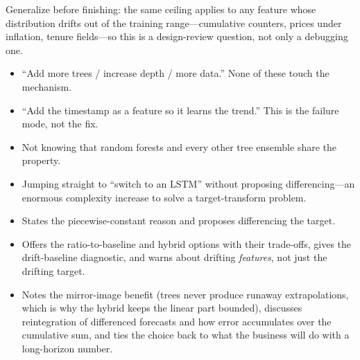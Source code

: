 \begin{interviewq}
Generalize before finishing: the same ceiling applies to any feature whose distribution drifts out of the training range---cumulative counters, prices under inflation, tenure fields---so this is a design-review question, not only a debugging one.

\redflags
\begin{itemize}
    \item ``Add more trees / increase depth / more data.'' None of these touch the mechanism.
    \item ``Add the timestamp as a feature so it learns the trend.'' This is the failure mode, not the fix.
    \item Not knowing that random forests and every other tree ensemble share the property.
    \item Jumping straight to ``switch to an LSTM'' without proposing differencing---an enormous complexity increase to solve a target-transform problem.
\end{itemize}


\goodgreat
\begin{itemize}
    \item {} States the piecewise-constant reason and proposes differencing the target.
    \item {} Offers the ratio-to-baseline and hybrid options with their trade-offs, gives the drift-baseline diagnostic, and warns about drifting \emph{features}, not just the drifting target.
    \item {} Notes the mirror-image benefit (trees never produce runaway extrapolations, which is why the hybrid keeps the linear part bounded), discusses reintegration of differenced forecasts and how error accumulates over the cumulative sum, and ties the choice back to what the business will do with a long-horizon number.
\end{itemize}

\end{interviewq}

